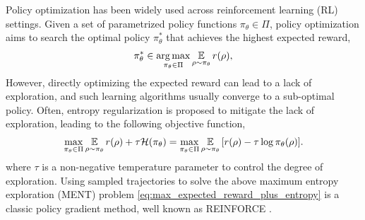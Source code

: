 \documentclass{article} %
\begin{document}
Policy optimization has been widely used across reinforcement learning (RL) settings. Given a set of parametrized policy functions $\pi_\theta \in \Pi$, policy optimization aims to search the optimal policy $\pi_\theta^*$ that achieves the highest expected reward,
\begin{equation}
\label{max_expected_reward}
\begin{split}
	\pi_\theta^* \in \operatorname*{arg\,max}_{\pi_\theta \in \Pi}{ \operatorname*{\mathbb{E}}\limits_{\rho \sim \pi_\theta}{r(\rho)} },
\end{split}
\end{equation}
However, directly optimizing the expected reward can lead to a lack of exploration, and such learning algorithms usually converge to a sub-optimal policy.
Often, entropy regularization is proposed to mitigate the lack of exploration, leading to the following objective function,
\begin{equation}
\label{eq:max_expected_reward_plus_entropy}
\begin{split}
	\max\limits_{\pi_\theta \in \Pi}{ \operatorname*{\mathbb{E}}\limits_{\rho \sim \pi_\theta}{  r(\rho) } + \tau \mathcal{H}(\pi_\theta) } = 
	\max\limits_{\pi_\theta \in \Pi}{ \operatorname*{\mathbb{E}}\limits_{\rho \sim \pi_\theta}{ \left[ r(\rho) - \tau \log{\pi_\theta(\rho)} \right] } }.
\end{split}
\end{equation}
where $\tau$ is a non-negative temperature parameter to control the degree of exploration. Using sampled trajectories to solve the above maximum entropy exploration (MENT) problem \cref{eq:max_expected_reward_plus_entropy} is a classic policy gradient method, well known as REINFORCE \citep{williams1992simple,williams1991function}.
\end{document}
